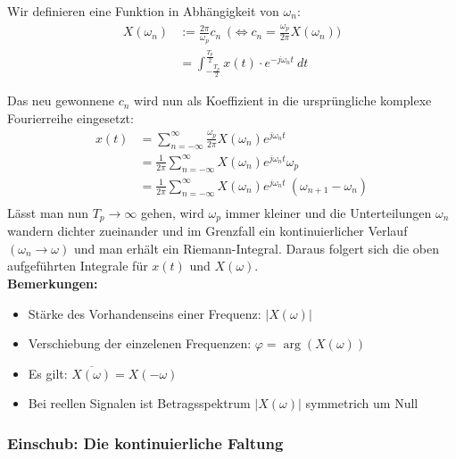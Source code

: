 \documentclass[12pt,a4paper]{scrartcl}
\begin{document}
  \noindent Wir definieren eine Funktion in Abhängigkeit von $\omega_n$:
  \begin{equation}
  \label{eq:5}
    \begin{split}
    X(\omega_n) &:= \frac{2\pi}{\omega_p}c_n\ \ \big( \Leftrightarrow c_n = \frac{\omega_p}{2\pi}X(\omega_n)\big)\\
    &= \int_{-\frac{T_p}{2}}^{\frac{T_p}{2}}x(t) \cdot e^{-j \omega_n t}\ d t
    \end{split}
  \end{equation}

  \noindent Das neu gewonnene $c_n$ wird nun als Koeffizient in die ursprüngliche komplexe Fourierreihe eingesetzt:
  \begin{equation}
    \label{eq:6}
      \begin{split}
      x(t) &= \sum_{n=-\infty}^{\infty}\frac{\omega_p}{2\pi}X(\omega_n)e^{j\omega_n t}\\
      &= \frac{1}{2\pi} \sum_{n=-\infty}^{\infty} X(\omega_n) e^{j\omega_n t} \omega_p \\
      &= \frac{1}{2\pi} \sum_{n=-\infty}^{\infty} X(\omega_n) e^{j\omega_n t} \ (\omega_{n + 1} - \omega_n)  \\
      \end{split}
    \end{equation}
    \noindent Lässt man nun $T_p \to \infty$ gehen, wird $\omega_p$ immer kleiner und die Unterteilungen $\omega_n$ wandern dichter zueinander
    und im Grenzfall ein kontinuierlicher Verlauf $(\omega_ n \to \omega)$ und man erhält ein Riemann-Integral. Daraus folgert sich die oben aufgeführten Integrale für $x(t)$ und $X(\omega)$.\\

    \noindent  \textbf{Bemerkungen:}
    \begin{itemize}
      \item Stärke des Vorhandenseins einer Frequenz: $|X(\omega)|$
      \item Verschiebung der einzelenen Frequenzen: $\varphi = \arg(X(\omega))$
      \item Es gilt: $\overline{X(\omega)} = X(-\omega)$
      \item Bei reellen Signalen ist Betragsspektrum $|X(\omega)|$ symmetrich um Null
    \end{itemize}

    \subsubsection{Einschub: Die kontinuierliche Faltung}
  \label{sec:sub:sub:faltung}
\end{document}
